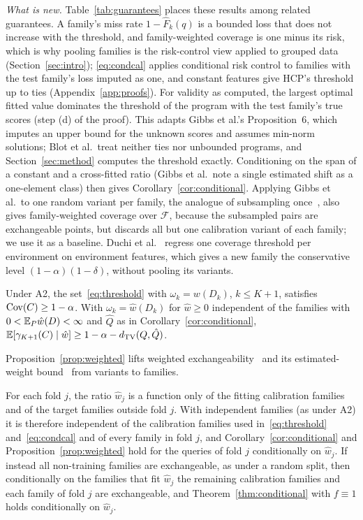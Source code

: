 \emph{What is new.} Table~\ref{tab:guarantees} places these results among related guarantees. A family's miss rate $1-\hat F_k(q)$ is a bounded loss that does not increase with the threshold, and family-weighted coverage is one minus its risk, which is why pooling families is the risk-control view applied to grouped data (Section~\ref{sec:intro}); \eqref{eq:condcal} applies conditional risk control to families with the test family's loss imputed as one, and constant features give HCP's threshold up to ties (Appendix~\ref{app:proofs}). For validity as computed, the largest optimal fitted value dominates the threshold of the program with the test family's true scores (step (d) of the proof). This adapts Gibbs et al.'s Proposition~6, which imputes an upper bound for the unknown scores and assumes min-norm solutions; Blot et al.\ treat neither ties nor unbounded programs, and Section~\ref{sec:method} computes the threshold exactly. Conditioning on the span of a constant and a cross-fitted ratio (Gibbs et al.\ note a single estimated shift as a one-element class) then gives Corollary~\ref{cor:conditional}. Applying Gibbs et al.\ to one random variant per family, the analogue of subsampling once~\cite{dunn2023distribution}, also gives family-weighted coverage over $\mathcal{F}$, because the subsampled pairs are exchangeable points, but discards all but one calibration variant of each family; we use it as a baseline. Duchi et al.~\cite[Cor.~7.27]{duchi2024predictive} regress one coverage threshold per environment on environment features, which gives a new family the conservative level $(1-\alpha)(1-\delta)$, without pooling its variants.

\begin{proposition}\label{prop:weighted}
Under A2, the set~\eqref{eq:threshold} with $\omega_k=w(D_k)$, $k\le K+1$, satisfies $\mathrm{Cov}(C)\ge1-\alpha$. With $\omega_k=\hat w(D_k)$ for $\hat w\ge0$ independent of the families with $0<\mathbb{E}_P\hat w(D)<\infty$ and $\hat Q$ as in Corollary~\ref{cor:conditional}, $\mathbb{E}[\gamma_{K+1}(C)\mid\hat w]\ge1-\alpha-d_{\mathrm{TV}}(Q,\hat Q)$.
\end{proposition}
Proposition~\ref{prop:weighted} lifts weighted exchangeability~\cite{tibshirani2019conformal} and its estimated-weight bound~\cite[Thm.~3]{lei2021conformal} from variants to families.

\begin{lemma}\label{lem:crossfit}
For each fold $j$, the ratio $\hat w_j$ is a function only of the fitting calibration families and of the target families outside fold $j$. With independent families (as under A2) it is therefore independent of the calibration families used in~\eqref{eq:threshold} and~\eqref{eq:condcal} and of every family in fold $j$, and Corollary~\ref{cor:conditional} and Proposition~\ref{prop:weighted} hold for the queries of fold $j$ conditionally on $\hat w_j$. If instead all non-training families are exchangeable, as under a random split, then conditionally on the families that fit $\hat w_j$ the remaining calibration families and each family of fold $j$ are exchangeable, and Theorem~\ref{thm:conditional} with $f\equiv1$ holds conditionally on $\hat w_j$.
\end{lemma}

